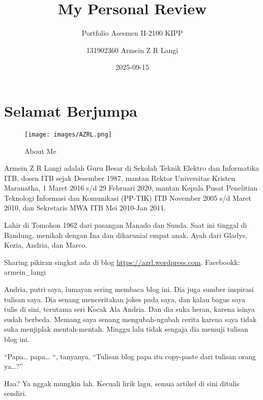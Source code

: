 \documentclass[
  letterpaper,
  DIV=11,
  numbers=noendperiod]{scrreprt}
\title{My Personal Review}
\subtitle{Portfolio Asesmen II-2100 KIPP}
\author{131902360 Armein Z R Langi}
\date{2025-09-15}
\renewcommand*\contentsname{Table of contents}
\newcommand\contentsname{Table of contents}
\begin{document}
\maketitle

\renewcommand*\contentsname{Table of contents}
{
\hypersetup{linkcolor=}
\setcounter{tocdepth}{2}
\tableofcontents
}


\chapter*{Selamat Berjumpa}\label{selamat-berjumpa}


\begin{figure}[H]

{\centering \texttt{[image: images/AZRL.png]}

}

\caption{About Me}

\end{figure}%

Armein Z R Langi adalah Guru Besar di Sekolah Teknik Elektro dan
Informatika ITB, dosen ITB sejak Desember 1987, mantan Rektor
Universitas Kristen Maranatha, 1 Maret 2016 s/d 29 Februari 2020, mantan
Kepala Pusat Penelitian Teknologi Informasi dan Komunikasi (PP-TIK) ITB
November 2005 s/d Maret 2010, dan Sekretaris MWA ITB Mei 2010-Jan 2011.

Lahir di Tomohon 1962 dari pasangan Manado dan Sunda. Saat ini tinggal
di Bandung, menikah dengan Ina dan dikaruniai empat anak. Ayah dari
Gladys, Kezia, Andria, dan Marco.

Sharing pikiran singkat ada di blog \url{https://azrl.wordpress.com}.
Facebookk: armein\_langi

Andria, putri saya, lumayan sering membaca blog ini. Dia juga sumber
inspirasi tulisan saya. Dia senang menceritakan jokes pada saya, dan
kalau bagus saya tulis di sini, terutama seri Kocak Ala Andria. Dan dia
suka heran, karena isinya sudah berbeda. Memang saya senang
mengubah-ngubah cerita karena saya tidak suka menjiplak mentah-mentah.
Minggu lalu tidak sengaja dia memuji tulisan blog ini.

``Papa\ldots{} papa\ldots{} ``, tanyanya, ``Tulisan blog papa itu
copy-paste dari tulisan orang ya\ldots?''

Haa? Ya nggak mungkin lah. Kecuali lirik lagu, semua artikel di sini
ditulis sendiri.
\end{document}
